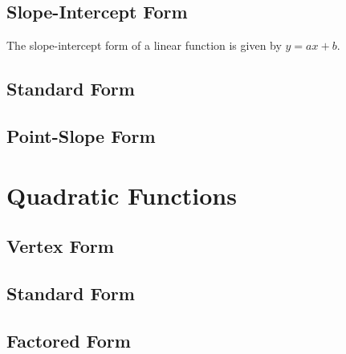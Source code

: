 \documentclass[11pt]{article}
\begin{document}
	\subsection{Slope-Intercept Form}
	The slope-intercept form of a linear function is given by $y=ax+b$.
	\subsection{Standard Form}
	\subsection{Point-Slope Form}
\section{Quadratic Functions}
	\subsection{Vertex Form}
	\subsection{Standard Form}
	\subsection{Factored Form}
\end{document}
